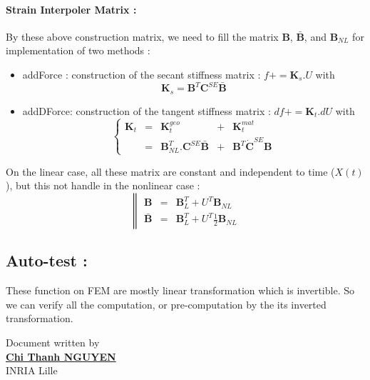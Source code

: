\documentclass[a4paper,10pt]{article}
\begin{document}
\paragraph{Strain Interpoler Matrix :} By these above construction matrix, we need to fill the matrix $\textbf{B}$, $\bar{\textbf{B}}$, and $\textbf{B}_{NL}$ for implementation of two methods :
\begin{itemize}
 \item addForce : construction of the secant stiffness matrix : $f+= \textbf{K}_s.U $ with
      \[     \textbf{K}_s =  \textbf{B}^T \textbf{C}^{SE}\bar{\textbf{B}}   \]
 \item addDForce: construction of the tangent stiffness matrix : $df+= \textbf{K}_t.dU $ with
      \[
      \left\{ 
      \begin{array}{ccccc}
	\textbf{K}_t   &=& \textbf{K}^{geo}_t &+& \textbf{K}^{mat}_t \\
                       &=& \textbf{B}^T_{NL}.\textbf{C}^{SE} \bar{\textbf{B}} & + &\textbf{B}^T \dot{\textbf{C}}^{SE} \textbf{B} 
      \end{array}\right.
      \]
\end{itemize}
On the linear case, all these matrix are constant and independent to time ($X(t)$), but this not handle in the nonlinear case : 
\[
\left\| 
\begin{array}{rcl}
      \textbf{B}   &=&  \textbf{B}^T_L +  U^T \textbf{B}_{NL}                               \\ 
 \bar{\textbf{B}}  &=&  \textbf{B}^T_L +  U^T \frac{1}{2}\textbf{B}_{NL}           
\end{array}\right.
\]

\subsection{Auto-test : }
These function on FEM are mostly linear transformation which is invertible. So we can verify all the computation, or pre-computation by the its inverted transformation. 


						      \begin{flushright}
						      Document written by \\
						      \href{mailto:chi-thanh.nguyen@inria.fr}{{\textbf {Chi Thanh NGUYEN}}} \\
						      INRIA Lille
						      \end{flushright}



\end{document}
